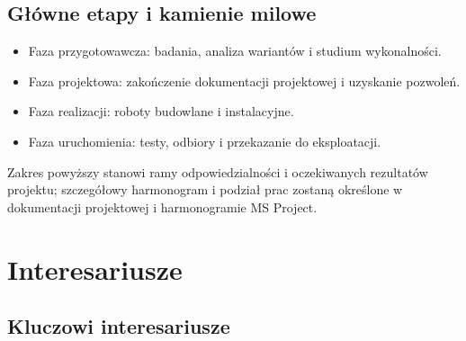 \documentclass[a4paper,12pt]{article}
\begin{document}
\subsection*{Główne etapy i kamienie milowe}
\begin{itemize}
    \item Faza przygotowawcza: badania, analiza wariantów i studium wykonalności.
    \item Faza projektowa: zakończenie dokumentacji projektowej i uzyskanie pozwoleń.
    \item Faza realizacji: roboty budowlane i instalacyjne.
    \item Faza uruchomienia: testy, odbiory i przekazanie do eksploatacji.
\end{itemize}

Zakres powyższy stanowi ramy odpowiedzialności i oczekiwanych rezultatów projektu; szczegółowy harmonogram i podział prac zostaną określone w dokumentacji projektowej i harmonogramie MS Project.

\section{Interesariusze}
\subsection*{Kluczowi interesariusze}
\end{document}
